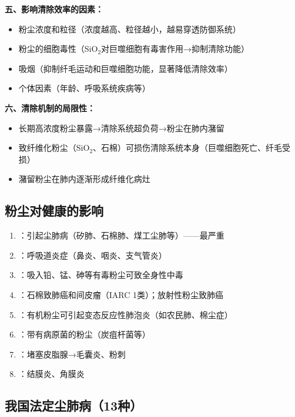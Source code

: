 \begin{keybox}
\textbf{五、影响清除效率的因素：}
\begin{itemize}[leftmargin=*]
    \item 粉尘浓度和粒径（浓度越高、粒径越小，越易穿透防御系统）
    \item 粉尘的细胞毒性（SiO$_2$对巨噬细胞有毒害作用→抑制清除功能）
    \item 吸烟（抑制纤毛运动和巨噬细胞功能，显著降低清除效率）
    \item 个体因素（年龄、呼吸系统疾病等）
\end{itemize}

\textbf{六、清除机制的局限性：}
\begin{itemize}[leftmargin=*]
    \item 长期高浓度粉尘暴露→清除系统超负荷→粉尘在肺内潴留
    \item 致纤维化粉尘（SiO$_2$、石棉）可损伤清除系统本身（巨噬细胞死亡、纤毛受损）
    \item 潴留粉尘在肺内逐渐形成纤维化病灶
\end{itemize}
\end{keybox}

\subsection{粉尘对健康的影响}

\begin{enumerate}[leftmargin=*]
    \item {}：引起尘肺病（矽肺、石棉肺、煤工尘肺等）——最严重
    \item {}：呼吸道炎症（鼻炎、咽炎、支气管炎）
    \item {}：吸入铅、锰、砷等有毒粉尘可致全身性中毒
    \item {}：石棉致肺癌和间皮瘤（IARC 1类）；放射性粉尘致肺癌
    \item {}：有机粉尘可引起变态反应性肺泡炎（如农民肺、棉尘症）
    \item {}：带有病原菌的粉尘（炭疽杆菌等）
    \item {}：堵塞皮脂腺→毛囊炎、粉刺
    \item {}：结膜炎、角膜炎
\end{enumerate}

\subsection{我国法定尘肺病（13种）}

